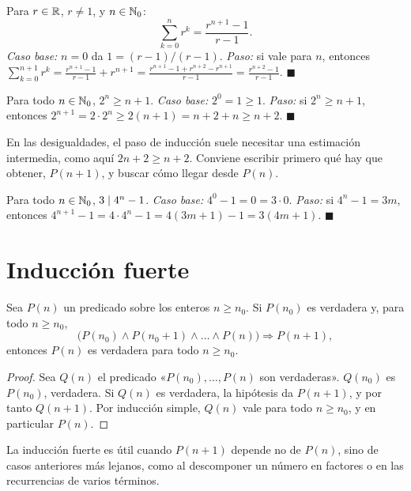 \begin{ejemplo}\label{ej:geometrica}
Para $r\in\mathbb{R}$, $r\neq 1$, y $n\in\mathbb{N}_0$:
\[
\sum_{k=0}^{n}r^{k}=\frac{r^{n+1}-1}{r-1}.
\]
\emph{Caso base:} $n=0$ da $1=(r-1)/(r-1)$. \emph{Paso:} si vale para $n$, entonces
$\sum_{k=0}^{n+1}r^{k}=\frac{r^{n+1}-1}{r-1}+r^{n+1}=\frac{r^{n+1}-1+r^{n+2}-r^{n+1}}{r-1}=\frac{r^{n+2}-1}{r-1}$. \hfill$\blacksquare$
\end{ejemplo}

\begin{ejemplo}\label{ej:desig-induccion}
Para todo $n\in\mathbb{N}_0$, $2^{n}\ge n+1$. \emph{Caso base:} $2^{0}=1\ge 1$. \emph{Paso:} si $2^{n}\ge n+1$, entonces $2^{n+1}=2\cdot 2^{n}\ge 2(n+1)=n+2+n\ge n+2$. \hfill$\blacksquare$
\end{ejemplo}

En las desigualdades, el paso de inducción suele necesitar una estimación intermedia, como aquí $2n+2\ge n+2$. Conviene escribir primero qué hay que obtener, $P(n+1)$, y buscar cómo llegar desde $P(n)$.

\begin{ejemplo}[Divisibilidad]\label{ej:div-induccion}
Para todo $n\in\mathbb{N}_0$, $3\mid 4^{n}-1$. \emph{Caso base:} $4^{0}-1=0=3\cdot 0$. \emph{Paso:} si $4^{n}-1=3m$, entonces $4^{n+1}-1=4\cdot 4^{n}-1=4(3m+1)-1=3(4m+1)$. \hfill$\blacksquare$
\end{ejemplo}

\section{Inducción fuerte}

\begin{teorema}\label{teo:induccion-fuerte}
Sea $P(n)$ un predicado sobre los enteros $n\ge n_0$. Si $P(n_0)$ es verdadera y, para todo $n\ge n_0$,
\[
\bigl(P(n_0)\wedge P(n_0+1)\wedge\dots\wedge P(n)\bigr)\Rightarrow P(n+1),
\]
entonces $P(n)$ es verdadera para todo $n\ge n_0$.
\end{teorema}

\begin{proof}
Sea $Q(n)$ el predicado «$P(n_0),\dots,P(n)$ son verdaderas». $Q(n_0)$ es $P(n_0)$, verdadera. Si $Q(n)$ es verdadera, la hipótesis da $P(n+1)$, y por tanto $Q(n+1)$. Por inducción simple, $Q(n)$ vale para todo $n\ge n_0$, y en particular $P(n)$.
\end{proof}

La inducción fuerte es útil cuando $P(n+1)$ depende no de $P(n)$, sino de casos anteriores más lejanos, como al descomponer un número en factores o en las recurrencias de varios términos.

